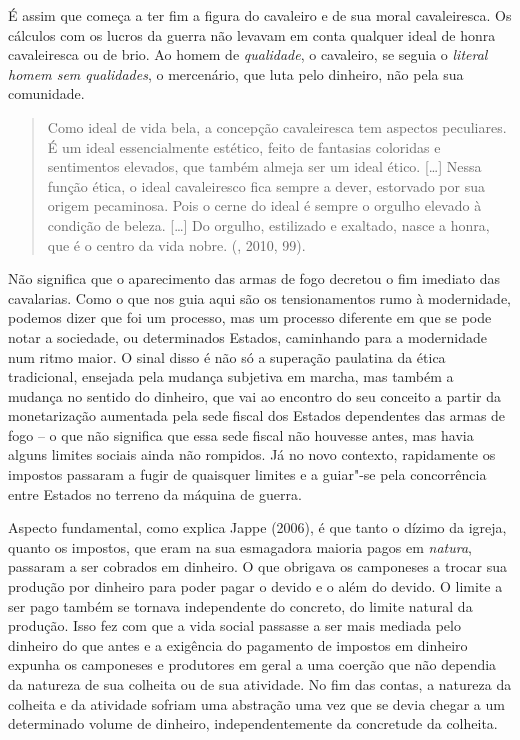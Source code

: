É assim que começa a ter fim a figura do cavaleiro e de sua moral
cavaleiresca. Os cálculos com os lucros da guerra não levavam em conta
qualquer ideal de honra cavaleiresca ou de brio. Ao homem de
\emph{qualidade}, o cavaleiro, se seguia o \emph{literal homem sem
qualidades}, o mercenário, que luta pelo dinheiro, não pela sua
comunidade.

\begin{quote}
Como ideal de vida bela, a concepção cavaleiresca tem aspectos
peculiares. É um ideal essencialmente estético, feito de fantasias
coloridas e sentimentos elevados, que também almeja ser um ideal ético.
[\ldots{}] Nessa função ética, o ideal cavaleiresco fica sempre a
dever, estorvado por sua origem pecaminosa. Pois o cerne do ideal é
sempre o orgulho elevado à condição de beleza. [\ldots{}] Do
orgulho, estilizado e exaltado, nasce a honra, que é o centro da vida
nobre. (, 2010, 99).
\end{quote}

Não significa que o aparecimento das armas de fogo decretou o fim
imediato das cavalarias. Como o que nos guia aqui são os tensionamentos
rumo à modernidade, podemos dizer que foi um processo, mas um processo
diferente em que se pode notar a sociedade, ou determinados Estados,
caminhando para a modernidade num ritmo maior. O sinal disso é não só a
superação paulatina da ética tradicional, ensejada pela mudança
subjetiva em marcha, mas também a mudança no sentido do dinheiro, que
vai ao encontro do seu conceito a partir da monetarização aumentada pela
sede fiscal dos Estados dependentes das armas de fogo -- o que não
significa que essa sede fiscal não houvesse antes, mas havia alguns
limites sociais ainda não rompidos. Já no novo contexto, rapidamente os
impostos passaram a fugir de quaisquer limites e a guiar"-se pela
concorrência entre Estados no terreno da máquina de guerra.

Aspecto fundamental, como explica Jappe (2006), é que tanto o dízimo da
igreja, quanto os impostos, que eram na sua esmagadora maioria pagos em
\emph{natura}, passaram a ser cobrados em dinheiro. O que obrigava os
camponeses a trocar sua produção por dinheiro para poder pagar o devido
e o além do devido. O limite a ser pago também se tornava independente
do concreto, do limite natural da produção. Isso fez com que a vida
social passasse a ser mais mediada pelo dinheiro do que antes e a
exigência do pagamento de impostos em dinheiro expunha os camponeses e
produtores em geral a uma coerção que não dependia da natureza de sua
colheita ou de sua atividade. No fim das contas, a natureza da colheita
e da atividade sofriam uma abstração uma vez que se devia chegar a um
determinado volume de dinheiro, independentemente da concretude da
colheita.

